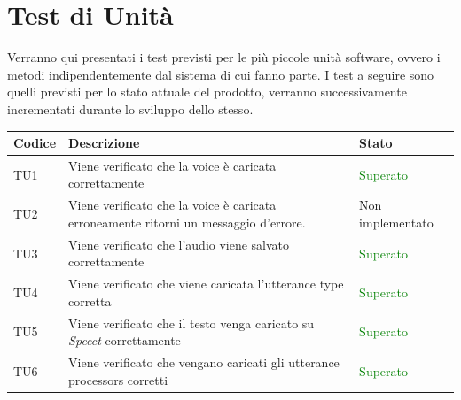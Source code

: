 \documentclass[openany,12pt,a4paper]{report}
\begin{document}
\section{Test di Unità}

Verranno qui presentati i test previsti per le più piccole unità software, ovvero i metodi indipendentemente dal sistema di cui fanno parte. I test a seguire sono quelli previsti per lo stato attuale del prodotto, verranno successivamente incrementati durante lo sviluppo dello stesso.


\setlength\LTleft{6mm}
\begin{longtable}{| p{2.5cm} |p{8cm} | p{2.5cm} |}
	\hline
	\textbf{Codice} & \textbf{Descrizione} & \textbf{Stato}\\
	\hline
	\endhead
	\newline TU1&
	\newline Viene verificato che la voice è caricata correttamente&
	\newline \textcolor{green}{Superato}
	\\[1em]
	\hline
	\newline TU2&
	\newline Viene verificato che la voice è caricata erroneamente ritorni un messaggio d'errore.&
	\newline Non implementato
	\\[1em]
	\hline
	\newline TU3&
	\newline Viene verificato che l'audio viene salvato correttamente&
	\newline \textcolor{green}{Superato}
	\\[1em]
	\hline
	\newline TU4&
	\newline Viene verificato che viene caricata l'utterance type corretta&
	\newline \textcolor{green}{Superato}
	\\[1em]
	\hline
	\newline TU5&
	\newline Viene verificato che il testo venga caricato su \textit{Speect} correttamente&
	\newline \textcolor{green}{Superato}
	\\[1em]
	\hline
	\newline TU6&
	\newline Viene verificato che vengano caricati gli utterance processors corretti&
	\newline \textcolor{green}{Superato}
	\\[1em]

\end{longtable}
\end{document}
